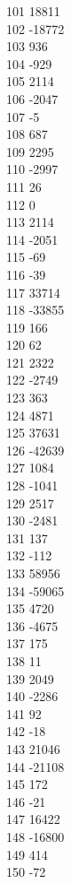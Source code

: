 { 101	18811 \\
 102	-18772 \\
 103	936 \\
 104	-929 \\
 105	2114 \\
 106	-2047 \\
 107	-5 \\
 108	687 \\
 109	2295 \\
 110	-2997 \\
 111	26 \\
 112	0 \\
 113	2114 \\
 114	-2051 \\
 115	-69 \\
 116	-39 \\
 117	33714 \\
 118	-33855 \\
 119	166 \\
 120	62 \\
 121	2322 \\
 122	-2749 \\
 123	363 \\
 124	4871 \\
 125	37631 \\
 126	-42639 \\
 127	1084 \\
 128	-1041 \\
 129	2517 \\
 130	-2481 \\
 131	137 \\
 132	-112 \\
 133	58956 \\
 134	-59065 \\
 135	4720 \\
 136	-4675 \\
 137	175 \\
 138	11 \\
 139	2049 \\
 140	-2286 \\
 141	92 \\
 142	-18 \\
 143	21046 \\
 144	-21108 \\
 145	172 \\
 146	-21 \\
 147	16422 \\
 148	-16800 \\
 149	414 \\
 150	-72 \\
}
